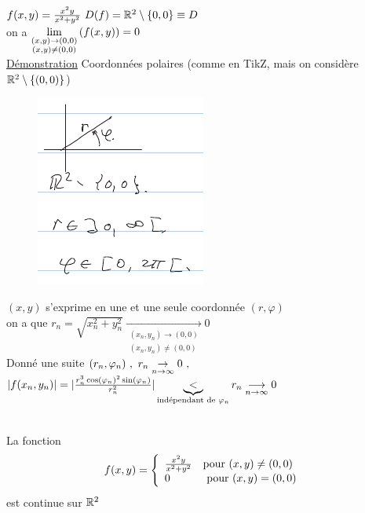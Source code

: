 \documentclass[12pt,a4paper]{article}
\begin{document}
\\
$f(x,y) = \frac{x^2y}{x^2+y^2} \ D(f) = \mathbb{R}^2 \setminus \{0,0\} \equiv D$\\
on a  $\lim\limits_{\substack{(x,y) \to (0,0) \\ (x,y) \neq (0,0)}}\left(f(x,y)\right) = 0$\\
\underline{Démonstration} Coordonnées polaires (comme en TikZ, mais on considère $\mathbb{R}^2\setminus\{(0,0)\}$)\\ 
\begin{figure}
\includegraphics[scale=0.5]{images/polaire}
\end{figure}
$(x,y)$ s'exprime en une et une seule coordonnée $(r,\varphi)$\\
on a que $r_n = \sqrt{x_n^2+y_n^2} \underset{{\substack{(x_n,y_n) \to (0,0) \\ (x_n,y_n) \neq (0,0)}}}{\longrightarrow} 0$\\
Donné une suite $(r_n, \varphi_n) \ , \ r_n \underset{n \to \infty}{\to} 0 \ ,$ \\
$|f(x_n,y_n)| = |\frac{r_n^3\cos(\varphi_n)^2\sin(\varphi_n)}{r_n^2}| \underbrace{<}_{\text{indépendant de }\varphi_n} r_n \underset{n \to \infty}{\longrightarrow} 0$ 

\begin{boite}
	\\
	La fonction 
	\begin{equation*}
		\overset{~}{f}(x,y) = \left\{\begin{array}{ll}
		\frac{x^2y}{x^2+y^2} & \text{pour } (x,y) \neq (0,0)\\
		0 & \mbox{ pour } (x,y) = (0,0)
		\end{array}\right.
	\end{equation*}
	est continue sur $\mathbb{R}^2$
\end{boite}
\end{document}
